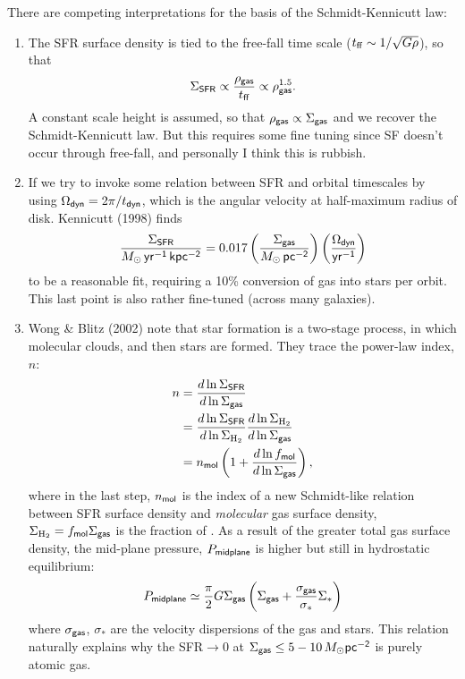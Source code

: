 \documentclass{tufte-handout}
\renewcommand{\rm}{\sf}
\newcommand{\Htwo}{\textnormal{H$_2$}}
\begin{document}
There are competing interpretations for the basis of the Schmidt-Kennicutt law:
\begin{enumerate}
\item The SFR surface density is tied to the free-fall time scale ($t_{\rm ff} \sim 1/ \sqrt{G\rho}$), so that
\[\Sigma_{\rm SFR} \propto \frac{\rho_{\rm gas}}{t_{\rm ff}} \propto \rho_{\rm gas}^{1.5}.\]
A constant scale height is assumed, so that $\rho_{\rm gas} \propto \Sigma_{\rm gas}$ and we recover the Schmidt-Kennicutt law. But this requires some fine tuning since SF doesn't occur through free-fall, and personally I think this is rubbish.
\item If we try to invoke some relation between SFR and orbital timescales by using $\Omega_{\rm dyn} = 2\pi/t_{\rm dyn}$, which is the angular velocity at half-maximum radius of disk. Kennicutt (1998) finds
\[\frac{\Sigma_{\rm SFR}}{M_\odot \rm\, yr^{-1}\, kpc^{-2}} = 0.017 \left (\frac{\Sigma_{\rm gas}}{M_\odot\, \rm pc^{-2}}\right )\left (\frac{\Omega_{\rm dyn}}{\rm yr^{-1}}\right )\]
to be a reasonable fit, requiring a 10\% conversion of gas into stars per orbit. This last point is also rather fine-tuned (across many galaxies).
\item Wong \& Blitz (2002) note that star formation is a two-stage process, in which molecular clouds, and then stars are formed. They trace the power-law index, $n$:
\begin{align}
n &= \frac{d \ln \Sigma_{\rm SFR}}{d\ln \Sigma_{\rm gas}} \nonumber \\
&= \frac{d\ln \Sigma_{\rm SFR}}{d \ln \Sigma_{\Htwo}}\frac{d\ln \Sigma_{\Htwo}}{d\ln \Sigma_{\rm gas}}\nonumber\\
&= n_{\rm mol}\left (1 + \frac{d\ln f_{\rm mol}}{d\ln \Sigma_{\rm gas}}\right ),
\end{align}
where in the last step, $n_{\rm mol}$ is the index of a new Schmidt-like relation between SFR surface density and \textit{molecular} gas surface density, $\Sigma_{\Htwo} = f_{\rm mol} \Sigma_{\rm gas}$ is the fraction of . As a result of the greater total gas surface density, the mid-plane pressure, $P_{\rm midplane}$ is higher but still in hydrostatic equilibrium:
\begin{equation}
P_{\rm midplane} \simeq \frac{\pi}{2}G \Sigma_{\rm gas}\left (\Sigma_{\rm gas} + \frac{\sigma_{\rm gas}}{\sigma_*}\Sigma_*\right )
\end{equation}
where $\sigma_{\rm gas}$, $\sigma_{*}$ are the velocity dispersions of the gas and stars. This relation naturally explains why the SFR$\rightarrow 0$ at $\Sigma_{\rm gas} \leq 5-10 \, M_\odot \rm pc^{-2}$ is purely atomic gas.
\end{enumerate}
\end{document}
